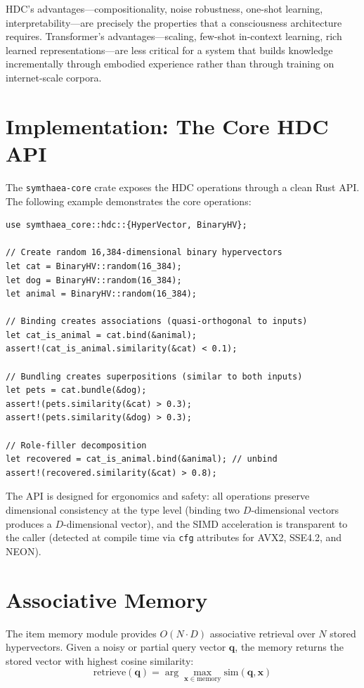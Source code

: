 \documentclass[12pt]{book}
\begin{document}
HDC's advantages---compositionality, noise robustness, one-shot learning, interpretability---are precisely the properties that a consciousness architecture requires. Transformer's advantages---scaling, few-shot in-context learning, rich learned representations---are less critical for a system that builds knowledge incrementally through embodied experience rather than through training on internet-scale corpora.

\section{Implementation: The Core HDC API}

The \texttt{symthaea-core} crate exposes the HDC operations through a clean Rust API. The following example demonstrates the core operations:

\begin{lstlisting}[caption={Core HDC operations in Symthaea.},label=lst:hdc-api]
use symthaea_core::hdc::{HyperVector, BinaryHV};

// Create random 16,384-dimensional binary hypervectors
let cat = BinaryHV::random(16_384);
let dog = BinaryHV::random(16_384);
let animal = BinaryHV::random(16_384);

// Binding creates associations (quasi-orthogonal to inputs)
let cat_is_animal = cat.bind(&animal);
assert!(cat_is_animal.similarity(&cat) < 0.1);

// Bundling creates superpositions (similar to both inputs)
let pets = cat.bundle(&dog);
assert!(pets.similarity(&cat) > 0.3);
assert!(pets.similarity(&dog) > 0.3);

// Role-filler decomposition
let recovered = cat_is_animal.bind(&animal); // unbind
assert!(recovered.similarity(&cat) > 0.8);
\end{lstlisting}

The API is designed for ergonomics and safety: all operations preserve dimensional consistency at the type level (binding two $D$-dimensional vectors produces a $D$-dimensional vector), and the SIMD acceleration is transparent to the caller (detected at compile time via \texttt{cfg} attributes for AVX2, SSE4.2, and NEON).

\section{Associative Memory}

The item memory module provides $O(N \cdot D)$ associative retrieval over $N$ stored hypervectors. Given a noisy or partial query vector $\mathbf{q}$, the memory returns the stored vector with highest cosine similarity:
\begin{equation}
\text{retrieve}(\mathbf{q}) = \arg\max_{\mathbf{x} \in \text{memory}} \text{sim}(\mathbf{q}, \mathbf{x})
\end{equation}
\end{document}
